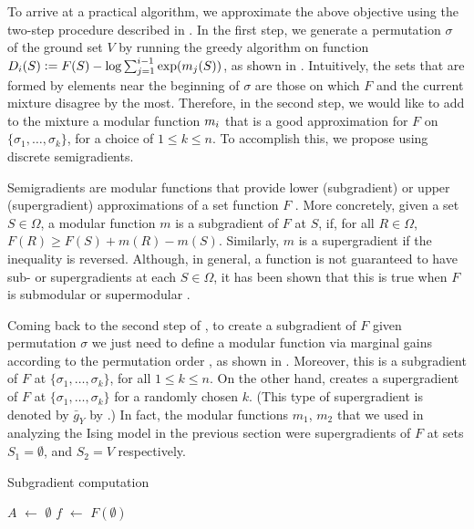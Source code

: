 To arrive at a practical algorithm, we approximate the above objective using the two-step procedure described in .
In the first step, we generate a permutation $\sigma$ of the ground set $V$ by running the greedy algorithm on function $D_i(S) \vcentcolon= F(S) - \log \sum_{j=1}^{i-1} \exp(m_j(S))$, as shown in .
Intuitively, the sets that are formed by elements near the beginning of $\sigma$ are those on which $F$ and the current mixture disagree by the most.
Therefore, in the second step, we would like to add to the mixture a modular function $m_i$ that is a good approximation for $F$ on $\{\sigma_1, \ldots, \sigma_k\}$, for a choice of $1 \leq k \leq n$.
To accomplish this, we propose using discrete semigradients.

Semigradients are modular functions that provide lower (subgradient) or upper (supergradient) approximations of a set function $F$ \citep{fujishige05,iyer13}.
More concretely, given a set $S \in \Omega$, a modular function $m$ is a subgradient of $F$ at $S$, if, for all $R \in \Omega$, $F(R) \geq F(S) + m(R) - m(S)$.
Similarly, $m$ is a supergradient if the inequality is reversed.
Although, in general, a function is not guaranteed to have sub- or supergradients at each $S \in \Omega$, it has been shown that this is true when $F$ is submodular or supermodular \citep{fujishige05, jegelka11, iyer12}.

Coming back to the second step of , to create a subgradient of $F$ given permutation $\sigma$ we just need to define a modular function via marginal gains according to the permutation order \citep{iyer13}, as shown in .
Moreover, this is a subgradient of $F$ at $\{\sigma_1, \ldots, \sigma_k\}$, for all $1 \leq k \leq n$.
On the other hand,  creates a supergradient of $F$ at $\{\sigma_1, \ldots, \sigma_k\}$ for a randomly chosen $k$. (This type of supergradient is denoted by $\bar{g}_Y$ by \cite{iyer13}.)
In fact, the modular functions $m_1$, $m_2$ that we used in analyzing the Ising model in the previous section were supergradients of $F$ at sets $S_1 = \emptyset$, and $S_2 = V$ respectively.

\begin{algorithm}[tb]
  \DontPrintSemicolon
  \caption{\strut Subgradient computation}
  \label{alg:sub}
  \vspace{0.5em}
  \SetKwInOut{Input}{Input}
  \Input{Set function $F$, permutation $\sigma$}
  $A$ $\gets$ $\emptyset$\;
  $f$ $\gets$ $F(\emptyset)$\;
  \For{$v = 1$ \KwTo $n$}{
    $m_v$ $\gets$ $F(A \cup \{\sigma_v\}) - F(A)$\;
    $A$ $\gets$ $A \cup \sigma_v$\;
  }
  \Return{$m(S) \defeq \sum_{v \in S} m_v$}\;%
\end{algorithm}


